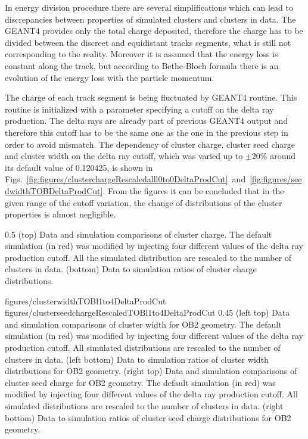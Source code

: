 In energy division procedure there are several simplifications which can lead to discrepancies between properties of simulated clusters and clusters in data. The GEANT4 provides only the total charge deposited, therefore the charge has to be divided between the discreet and equidistant tracks segments, what is still not corresponding to the reality. Moreover it is assumed that the energy loss is constant along the track, but according to Bethe-Bloch formula there is an evolution of the energy loss with the particle momentum.

The charge of each track segment is being fluctuated by GEANT4 routine. This routine is initialized with a parameter specifying a cutoff on the delta ray production. The delta rays are already part of previous GEANT4 output and therefore this cutoff has to be the same one as the one in the previous step in order to avoid mismatch. The dependency of cluster charge, cluster seed charge and cluster width on the delta ray cutoff, which was varied up to $\pm 20\%$ around its default value of 0.120425, is shown in Figs.~\ref{fig:figures/clusterchargeRescaledalll0to0DeltaProdCut}~and~\ref{fig:figures/seedwidthTOBDeltaProdCut}. From the figures it can be concluded that in the given range of the cutoff variation, the change of distributions of the cluster properties is almost negligible. 

                 {0.5}       %
                 { (top) Data and simulation comparisons of cluster charge. The default simulation (in red) was modified by injecting four different values of the delta ray production cutoff. All the simulated distribution are rescaled to the number of clusters in data. (bottom) Data to simulation ratios of cluster charge distributions. }

                 {figures/clusterwidthTOBl1to4DeltaProdCut}
                 {figures/clusterseedchargeRescaledTOBl1to4DeltaProdCut} %
                 {0.45}       %
                 {(left top) Data and simulation  comparisons of cluster width for OB2 geometry. The default simulation (in red) was modified by injecting four different values of the delta ray production cutoff. All simulated distributions are rescaled to the number of clusters in data. (left bottom) Data to simulation ratios of cluster width distributions for OB2 geometry. (right top) Data and simulation  comparisons of cluster seed charge for OB2 geometry. The default simulation (in red) was modified by injecting four different values of the delta ray production cutoff. All simulated distributions are rescaled to the number of clusters in data. (right bottom) Data to simulation ratios of cluster seed charge distributions for OB2 geometry. }


